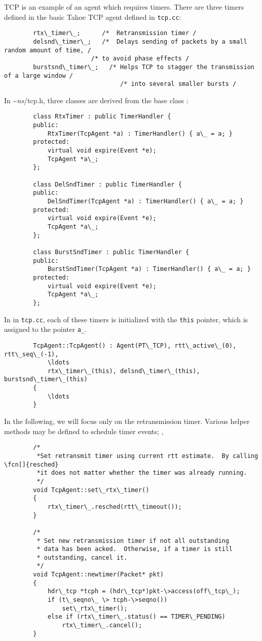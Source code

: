 TCP is an example of an agent which requires timers.  There are three timers
defined in the basic Tahoe TCP agent defined in {\tt tcp.cc}:
\begin{verbatim}
        rtx\_timer\_;      /*  Retransmission timer /
        delsnd\_timer\_;   /*  Delays sending of packets by a small random amount of time, /
                        /* to avoid phase effects /
        burstsnd\_timer\_;   /* Helps TCP to stagger the transmission of a large window /
                                /* into several smaller bursts /
\end{verbatim}
In \textasciitilde\emph{ns}/{tcp.h}, three classes are derived from the base class
:
\begin{verbatim}
        class RtxTimer : public TimerHandler {
        public:
            RtxTimer(TcpAgent *a) : TimerHandler() { a\_ = a; }
        protected:                   
            virtual void expire(Event *e);
            TcpAgent *a\_;
        };  
            
        class DelSndTimer : public TimerHandler {
        public:
            DelSndTimer(TcpAgent *a) : TimerHandler() { a\_ = a; }
        protected:
            virtual void expire(Event *e);
            TcpAgent *a\_;
        };      
    
        class BurstSndTimer : public TimerHandler {
        public: 
            BurstSndTimer(TcpAgent *a) : TimerHandler() { a\_ = a; }
        protected:
            virtual void expire(Event *e); 
            TcpAgent *a\_;
        };  
\end{verbatim}
In
in {\tt tcp.cc},
each of these timers
is initialized with the {\tt this} pointer,
which is assigned to the pointer {\tt a\_}.
\begin{verbatim}
        TcpAgent::TcpAgent() : Agent(PT\_TCP), rtt\_active\_(0), rtt\_seq\_(-1), 
            \ldots
            rtx\_timer\_(this), delsnd\_timer\_(this), burstsnd\_timer\_(this)
        {
            \ldots
        }
\end{verbatim}
In the following, we will focus only on the retransmission timer.  Various
helper methods may be defined to schedule timer events; \eg,
\begin{verbatim}
        /*
         *Set retransmit timer using current rtt estimate.  By calling \fcn[]{resched}
         *it does not matter whether the timer was already running.
         */
        void TcpAgent::set\_rtx\_timer()
        {
            rtx\_timer\_.resched(rtt\_timeout());
        }

        /*
         * Set new retransmission timer if not all outstanding
         * data has been acked.  Otherwise, if a timer is still
         * outstanding, cancel it.
         */
        void TcpAgent::newtimer(Packet* pkt)
        {
            hdr\_tcp *tcph = (hdr\_tcp*)pkt-\>access(off\_tcp\_);
            if (t\_seqno\_ \> tcph-\>seqno())
                set\_rtx\_timer();
            else if (rtx\_timer\_.status() == TIMER\_PENDING)
                rtx\_timer\_.cancel();
        }
\end{verbatim}
